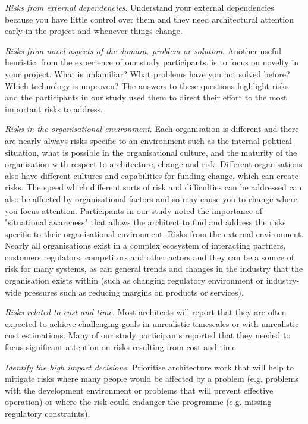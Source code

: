 \begin{description}
	\item \emph{Risks from external dependencies}.  Understand your external dependencies because you have little control over them and they need architectural attention early in the project and whenever things change.
	\item \emph{Risks from novel aspects of the domain, problem or solution}.  Another useful heuristic, from the experience of our study participants, is to focus on novelty in your project.  What is unfamiliar?  What problems have you not solved before?  Which technology is unproven? The answers to these questions highlight risks and the participants in our study used them to direct their effort to the most important risks to address.
	\item \emph{Risks in the organisational environment}.  Each organisation is different and there are nearly always risks specific to an environment such as the internal political situation, what is possible in the organisational culture, and the maturity of the organisation with respect to architecture, change and risk.  Different organisations also have different cultures and capabilities for funding change, which can create risks.  The speed which different sorts of risk and difficulties can be addressed can also be affected by organisational factors and so may cause you to change where you focus attention.  Participants in our study noted the importance of "situational awareness" \cite{wikipedia-sitawareness} that allows the architect to find and address the risks specific to their organisational environment.
	Risks from the external environment.  Nearly all organisations exist in a complex ecosystem of interacting partners, customers regulators, competitors and other actors and they can be a source of risk for many systems, as can general trends and changes in the industry that the organisation exists within (such as changing regulatory environment or industry-wide pressures such as reducing margins on products or services). 
	\item \emph{Risks related to cost and time}.  Most architects will report that they are often expected to achieve challenging goals in unrealistic timescales or with unrealistic cost estimations.  Many of our study participants reported that they needed to focus significant attention on risks resulting from cost and time.
	\item \emph{Identify the high impact decisions}.  Prioritise architecture work that will help to mitigate risks where many people would be affected by a problem (e.g. problems with the development environment or problems that will prevent effective operation) or where the risk could endanger the programme (e.g. missing regulatory constraints).
\end{description}

